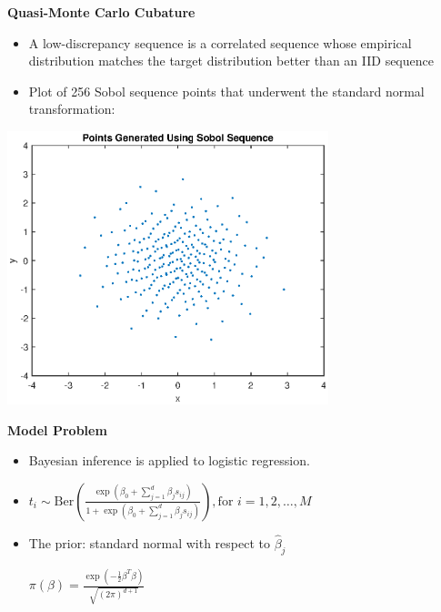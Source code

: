 \documentclass[final,mathserif]{beamer}
\newcommand{\blue}[1]{{\color{myblue}#1}}
\renewcommand{\blue}{\textcolor{blue!80!black}}
\begin{document}
\begin{frame}[fragile]
\begin{columns}[t]
\begin{column}{.31\linewidth}
\begin{block} {\Large \textbf{\blue {Quasi-Monte Carlo Cubature}}}
\begin{itemize}
\item A low-discrepancy sequence is a \alert{correlated} sequence whose empirical distribution matches the target distribution better than an IID sequence

\item Plot of 256 Sobol sequence points that underwent the standard normal transformation:

\end{itemize}
\begin{center}
\includegraphics[width=0.7\textwidth]{SobolPoints}
\end{center}
\end{block}

\vspace{.1in}

\begin{block}{\Large \textbf{\blue {Model Problem}}}
\vspace{.1in}
\begin{itemize}
\item Bayesian inference is applied to logistic regression.

\item $t_i \sim \text{Ber} \left(\frac{\exp{\left(\beta_0+\sum_{j=1}^d\beta_j s_{ij}\right)}} {1+\exp \left({{\beta_0+\sum_{j=1}^d\beta_js_{ij}}}\right)}\right), \text{for } i=1, 2, \dots , M$

\vspace{.05in}

\item The prior: standard normal with respect to $\hat{\beta}_j$

\vspace{.05in}

$\pi(\beta)=\frac{\exp{\left({-\frac{1}{2}\beta^T\beta}\right )}}{\sqrt{(2\pi)^{d+1}}}$


\end{itemize}
\end{block}
\end{column}
\end{columns}
\end{frame}
\end{document}
